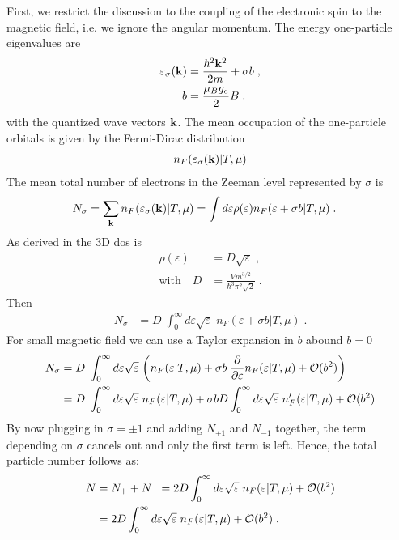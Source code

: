 First, we restrict the discussion to the coupling of the electronic spin to the magnetic field, i.e.
we ignore the angular momentum.
The energy one-particle eigenvalues are
%
\begin{align*}
\varepsilon_{\sigma}(\mathbf k) &= \frac{\hbar^{2} \mathbf k^{2}}{2m} +\sigma b\;,\\
b &= \frac{\mu_{B} g_{e} }{2}B\;.
\end{align*}
%
with the quantized wave vectors $\mathbf k$.
The mean occupation of the one-particle orbitals is given by the Fermi-Dirac distribution
%
\begin{align*}
n_{F}(\varepsilon_{\sigma}(\mathbf k)|T,\mu)
\end{align*}
%
The mean total number of electrons in the Zeeman level represented by $\sigma$ is
%
\begin{align*}
N_{\sigma} &=\sum_{\mathbf k} n_{F}(\varepsilon_{\sigma}(\mathbf k)|T,\mu)
= \int d\varepsilon \rho(\varepsilon) n_{F}(\varepsilon +\sigma b|T,\mu)\;.
\end{align*}
%
As derived in  the 3D dos is
%
%
\begin{subequations}\label{eq:para:pauli:1}
\begin{align}
\rho(\varepsilon)&= D \sqrt{\varepsilon}\;,\\
\text{with}\quad D&=\frac{V m^{3/2}}{\hbar^{3} \pi^{2}\sqrt{2}}\;.
\end{align}
\end{subequations}
%
Then
%
\begin{align*}
N_{\sigma} &=D\;
\int_{0}^{\infty} d\varepsilon \sqrt{\varepsilon} \; n_{F}(\varepsilon +\sigma b|T,\mu)\;.
\end{align*}
%
For small magnetic field we can use a Taylor expansion in $b$ abound $b=0$
%
\begin{align*}
N_{\sigma} &=D\;
\int_{0}^{\infty} d\varepsilon \sqrt{\varepsilon} \; 
\bigg(n_{F}(\varepsilon|T,\mu) +\sigma b \;\frac{\partial }{\partial \varepsilon}n_{F}(\varepsilon|T,\mu) +{\cal O}(b^{2})\bigg)\\
 &=D\;
\int_{0}^{\infty} d\varepsilon \sqrt{\varepsilon} \; 
n_{F}(\varepsilon|T,\mu) 
+\sigma b D \int_{0}^{\infty} d\varepsilon \sqrt{\varepsilon} \;n'_{F}(\varepsilon|T,\mu) +{\cal O}(b^{2})
\end{align*}
%
By now plugging in $\sigma = \pm 1$ and adding $N_{+1}$ and $N_{-1}$ together, the term depending on $\sigma$ cancels out and only the first term is left. Hence, the total particle number follows as:
\begin{align}
N &= N_{+}+N_{-} = 2 D \int_{0}^{\infty} d\varepsilon \sqrt{\varepsilon} \;n_{F}
(\varepsilon|T,\mu) +
{\cal O}(b^{2})\notag\\
&= 2 D \int_{0}^{\infty} d\varepsilon \sqrt{\varepsilon} \;n_{F}
(\varepsilon|T,\mu) +
{\cal O}(b^{2})\;.\label{eq:N:total}
\end{align}
